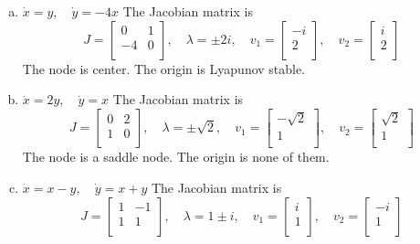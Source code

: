 \documentclass[12pt]{exam}
\begin{document}
\begin{enumerate}[(a)]
    \item $\dot{x} = y , \quad \dot{y} = -4x$
	    The Jacobian matrix is
	    \[ J = \begin{bmatrix}
	        0 & 1 \\
	        -4 & 0 \\
		\end{bmatrix} , \quad \lambda = \pm 2i, \quad v_1= \begin{bmatrix}
		    -i \\
		    2 \\
		\end{bmatrix} , \quad v_2 = \begin{bmatrix}
		i \\
		2 \\
		\end{bmatrix} \]
	The node is center. The origin is Lyapunov stable.

    \item $\dot{x} = 2y, \quad \dot{y} = x$
	    The Jacobian matrix is
	    \[ J = \begin{bmatrix}
	        0 & 2 \\
	        1 & 0 \\
		\end{bmatrix} , \quad \lambda = \pm \sqrt{2}, \quad v_1= \begin{bmatrix}
		-\sqrt{2} \\
		1 \\
		\end{bmatrix} , \quad v_2 = \begin{bmatrix}
		\sqrt{2} \\
		1 \\
		\end{bmatrix} \]
   	The node is a saddle node. The origin is none of them. 

    \item $\dot{x} = x-y, \quad \dot{y} = x+y$
	    The Jacobian matrix is
	    \[ J = \begin{bmatrix}
	        1 & -1 \\
	        1 & 1 \\
		\end{bmatrix} , \quad \lambda = 1\pm i , \quad v_1= \begin{bmatrix}
		i \\
		1 \\
		\end{bmatrix} , \quad v_2 = \begin{bmatrix}
		-i \\
		1 \\
	\end{bmatrix} \]


\end{enumerate}
\end{document}
